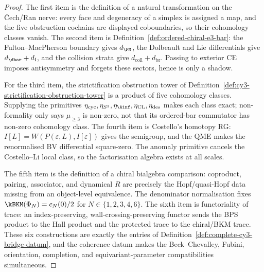\begin{proof}
The first item is the definition of a natural transformation on the
\v{C}ech/Ran nerve: every face and degeneracy of a simplex is assigned a
map, and the five obstruction cochains are displayed coboundaries, so
their cohomology classes vanish. The second item is
Definition~\ref{def:ordered-chiral-e3-bar}: the Fulton--MacPherson
boundary gives $d_{\FM}$, the Dolbeault and Lie differentials give
$d_{\dbar}+d_{\mathfrak l}$, and the collision strata give
$d_{\mathrm{coll}}+d_{\mathrm{br}}$. Passing to exterior CE imposes
antisymmetry and forgets these sectors, hence is only a shadow.

For the third item, the strictification obstruction tower of
Definition~\ref{def:cy3-strictification-obstruction-tower} is a product
of five cohomology classes. Supplying the primitives
$\eta_{\mathrm{cyc}},\eta_{S^3},\eta_{\Ainf},\eta_{\mathrm{CL}},
\eta_{\mathrm{des}}$ makes each class exact; non-formality only says
$\mu_{\geq3}$ is non-zero, not that its ordered-bar commutator has
non-zero cohomology class. The fourth item is Costello's homotopy RG:
$I[L]=W(P(\varepsilon,L),I[\varepsilon])$ gives the semigroup, and the
QME makes the renormalised BV differential square-zero. The anomaly
primitive cancels the Costello--Li local class, so the factorisation
algebra exists at all scales.

The fifth item is the definition of a chiral bialgebra comparison:
coproduct, pairing, associator, and dynamical $R$ are precisely the
Hopf/quasi-Hopf data missing from an object-level equivalence. The
denominator normalisation fixes
$\kBKM(\Phi_N)=c_N(0)/2$ for $N\in\{1,2,3,4,6\}$. The sixth item is
functoriality of trace: an index-preserving, wall-crossing-preserving
functor sends the BPS product to the Hall product and the protected
trace to the chiral/BKM trace. These six constructions are exactly the
entries of Definition~\ref{def:complete-cy3-bridge-datum}, and the
coherence datum makes the Beck--Chevalley, Fubini, orientation,
completion, and equivariant-parameter compatibilities simultaneous.
\end{proof}

